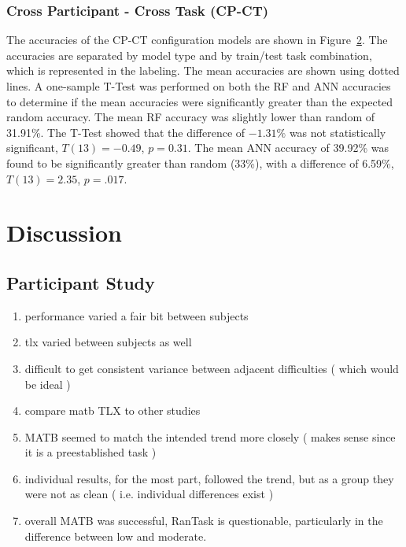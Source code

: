 \documentclass[11pt]{article}
\begin{document}
		\begin{figure}
		\centering
		\caption{}
		\label{fig:cp-at}
		\end{figure} 
		
		\subsubsection{Cross Participant - Cross Task (CP-CT)}
		The accuracies of the CP-CT configuration models are shown in Figure~\ref{fig:cp-ct}. The accuracies are separated by model type and by train/test task combination, which is represented in the labeling. The mean accuracies are shown using dotted lines. A one-sample T-Test was performed on both the RF and ANN accuracies to determine if the mean accuracies were significantly greater than the expected random accuracy. The mean RF accuracy was slightly lower than random of 31.91\%. The T-Test showed that the difference of \(-1.31\%\) was not statistically significant, \(T(13) = -0.49\), \(p = 0.31\). The mean ANN accuracy of 39.92\% was found to be significantly greater than random (33\%), with a difference of 6.59\%, \(T(13) = 2.35\), \(p = .017\).
		
		\begin{figure}
		\centering
		\caption{}
		\label{fig:cp-ct}
		\end{figure} 

		
\section{Discussion}


	\subsection{Participant Study}
	\begin{enumerate}
		\item performance varied a fair bit between subjects
		\item tlx varied between subjects as well
		\item difficult to get consistent variance between adjacent difficulties ( which would be ideal )
		\item compare matb TLX to other studies
		\item MATB seemed to match the intended trend more closely ( makes sense since it is a preestablished task )
		\item individual results, for the most part, followed the trend, but as a group they were not as clean ( i.e. individual differences exist )
		\item overall MATB was successful, RanTask is questionable, particularly in the difference between low and moderate.
	\end{enumerate}
	
\end{document}
